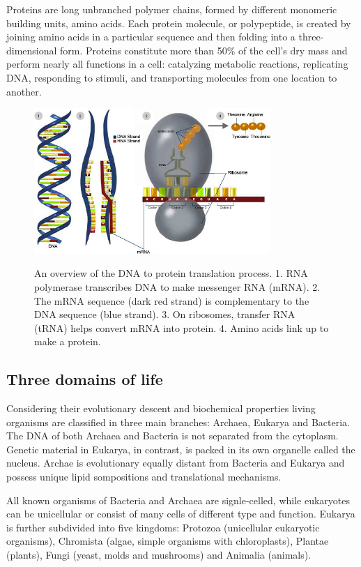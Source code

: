 \documentclass[11pt, a4paper,oneside]{report}
\begin{document}
Proteins are long unbranched polymer chains, formed by different monomeric building units, amino acids. Each protein molecule, or polypeptide, is created by joining amino acids in a particular sequence and then folding into a three-dimensional form. Proteins constitute more than 50\%  of the cell's dry mass \cite{Alberts2007} and perform nearly all functions in a cell: catalyzing metabolic reactions, replicating DNA, responding to stimuli, and transporting molecules from one location to another.
\begin{figure}[ht]
\begin{center}
\label{img:dnatoprotein}
\includegraphics[width=0.8\textwidth]{figures/dna_to_protein.jpg}
\end{center}
\caption{An overview of the DNA to protein translation process. 1. RNA polymerase transcribes DNA to make messenger RNA (mRNA). 2. The mRNA sequence (dark red strand) is complementary to the DNA sequence (blue strand). 3. On ribosomes, transfer RNA (tRNA) helps convert mRNA into protein. 4. Amino acids link up to make a protein.} 
\end{figure}

\subsection{Three domains of life}
Considering their evolutionary descent and biochemical properties  living organisms are classified in three main branches: Archaea, Eukarya and Bacteria. The DNA of both Archaea and Bacteria is not separated from the cytoplasm. Genetic material in Eukarya, in contrast, is packed in its own organelle called the nucleus. Archae is evolutionary equally distant from Bacteria and Eukarya and possess unique lipid sompositions and translational mechanisms. 

All known organisms of Bacteria and Archaea are signle-celled, while eukaryotes can be unicellular or consist of many cells of different type and function. Eukarya is further subdivided into five kingdoms: Protozoa (unicellular eukaryotic organisms), Chromista (algae, simple organisms with chloroplasts), Plantae (plants), Fungi (yeast, molds and mushrooms) and Animalia (animals).    
\end{document}
